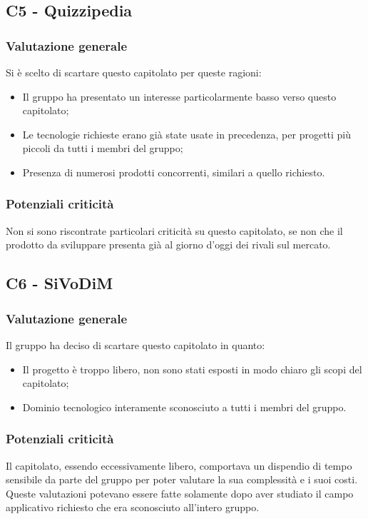 \documentclass[a4paper]{article}
\begin{document}
		\subsection{C5 - Quizzipedia}
			\subsubsection{Valutazione generale}
				Si è scelto di scartare questo capitolato per queste ragioni:
				\begin{itemize}
					\item Il gruppo ha presentato un interesse particolarmente basso verso questo capitolato;
					\item Le tecnologie richieste erano già state usate in precedenza, per progetti più piccoli da tutti i membri del gruppo;
					\item Presenza di numerosi prodotti concorrenti, similari a quello richiesto.
				\end{itemize}
			\subsubsection{Potenziali criticità}
				Non si sono riscontrate particolari criticità su questo capitolato, se non che il prodotto da sviluppare presenta già al giorno d'oggi 
				dei rivali sul mercato. 
				
		\subsection{C6 - SiVoDiM}
			\subsubsection{Valutazione generale}
				Il gruppo ha deciso di scartare questo capitolato in quanto:
				\begin{itemize}
					\item Il progetto è troppo libero, non sono stati esposti in modo chiaro gli scopi del capitolato;
					\item Dominio tecnologico interamente sconosciuto a tutti i membri del gruppo.
				\end{itemize}
			\subsubsection{Potenziali criticità}
				Il capitolato, essendo eccessivamente libero, comportava un dispendio di tempo sensibile da parte del gruppo per poter valutare la 
				sua complessità e i suoi costi. Queste valutazioni potevano essere fatte solamente dopo aver studiato il campo applicativo richiesto 
				che era sconosciuto all'intero gruppo. 
				
	
		
\end{document}
